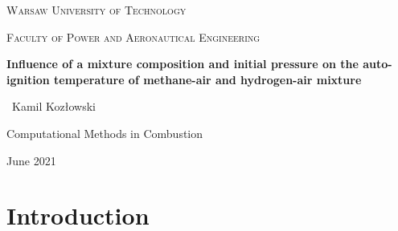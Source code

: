 \documentclass[a4paper,11pt]{article}
\begin{document}
\begin{titlepage}
	\centering
	{\scshape\LARGE Warsaw University of Technology \par}
	\vspace{1cm}
	{\scshape\Large Faculty of Power and Aeronautical Engineering\par}
	\vspace{3.5cm}
	{\huge\bfseries Influence of a mixture composition and initial pressure on the auto-ignition temperature of methane-air and hydrogen-air mixture\par}
	\vspace{3cm}
	{\Large\ Kamil Kozłowski\par}
	\vfill
	Computational Methods in Combustion\par

	\vfill

	{\large June 2021\par}
\end{titlepage}


\tableofcontents
\newpage


 \section{Introduction}
    	
\end{document}
